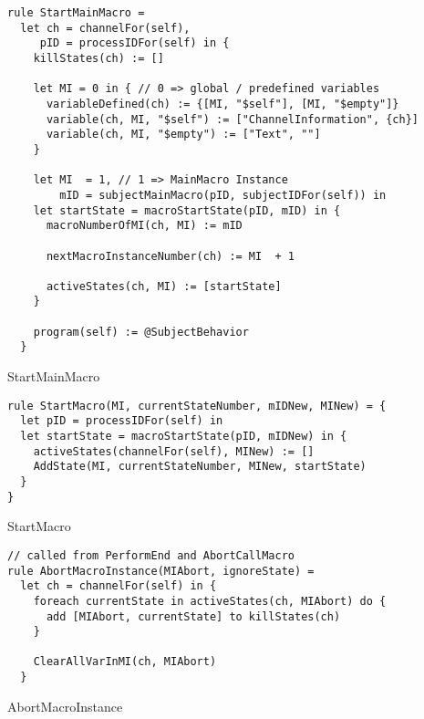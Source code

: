 \begin{listing}[H]
\begin{verbatim}
rule StartMainMacro =
  let ch = channelFor(self),
     pID = processIDFor(self) in {
    killStates(ch) := []

    let MI = 0 in { // 0 => global / predefined variables
      variableDefined(ch) := {[MI, "$self"], [MI, "$empty"]}
      variable(ch, MI, "$self") := ["ChannelInformation", {ch}]
      variable(ch, MI, "$empty") := ["Text", ""]
    }

    let MI  = 1, // 1 => MainMacro Instance
        mID = subjectMainMacro(pID, subjectIDFor(self)) in
    let startState = macroStartState(pID, mID) in {
      macroNumberOfMI(ch, MI) := mID

      nextMacroInstanceNumber(ch) := MI  + 1

      activeStates(ch, MI) := [startState]
    }

    program(self) := @SubjectBehavior
  }
\end{verbatim}
\caption{StartMainMacro}
\label{lst:asm:StartMainMacro}
\end{listing}




\begin{listing}[H]
\begin{verbatim}
rule StartMacro(MI, currentStateNumber, mIDNew, MINew) = {
  let pID = processIDFor(self) in
  let startState = macroStartState(pID, mIDNew) in {
    activeStates(channelFor(self), MINew) := []
    AddState(MI, currentStateNumber, MINew, startState)
  }
}
\end{verbatim}
\caption{StartMacro}
\label{lst:asm:StartMacro}
\end{listing}


\begin{listing}[H]
\begin{verbatim}
// called from PerformEnd and AbortCallMacro
rule AbortMacroInstance(MIAbort, ignoreState) =
  let ch = channelFor(self) in {
    foreach currentState in activeStates(ch, MIAbort) do {
      add [MIAbort, currentState] to killStates(ch)
    }

    ClearAllVarInMI(ch, MIAbort)
  }
\end{verbatim}
\caption{AbortMacroInstance}
\label{lst:asm:AbortMacroInstance}
\end{listing}



